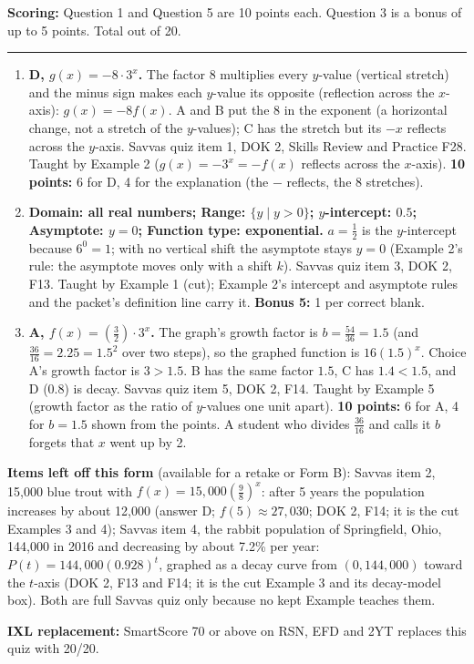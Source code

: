 \documentclass[11pt]{article}
\begin{document}
\vfill
\noindent\textbf{Scoring:} Question 1 and Question 5 are 10 points each. Question 3 is a bonus of up to 5 points. Total out of 20.

\newpage
{}

\vspace{4pt}\noindent\rule{\textwidth}{0.6pt}

\begin{enumerate}
\item[\textbf{1.}] \textbf{D, $g(x)=-8\cdot3^x$.} The factor 8 multiplies every $y$-value (vertical stretch) and the minus sign makes each $y$-value its opposite (reflection across the $x$-axis): $g(x)=-8f(x)$. A and B put the 8 in the exponent (a horizontal change, not a stretch of the $y$-values); C has the stretch but its $-x$ reflects across the $y$-axis. Savvas quiz item 1, DOK 2, Skills Review and Practice F28. Taught by Example 2 ($g(x)=-3^x=-f(x)$ reflects across the $x$-axis). \textbf{10 points:} 6 for D, 4 for the explanation (the $-$ reflects, the 8 stretches).
\item[\textbf{3.}] \textbf{Domain: all real numbers; Range: $\{y\mid y>0\}$; $y$-intercept: $0.5$; Asymptote: $y=0$; Function type: exponential.} $a=\frac12$ is the $y$-intercept because $6^0=1$; with no vertical shift the asymptote stays $y=0$ (Example 2's rule: the asymptote moves only with a shift $k$). Savvas quiz item 3, DOK 2, F13. Taught by Example 1 (cut); Example 2's intercept and asymptote rules and the packet's definition line carry it. \textbf{Bonus 5:} 1 per correct blank.
\item[\textbf{5.}] \textbf{A, $f(x)=\left(\frac32\right)\cdot3^x$.} The graph's growth factor is $b=\frac{54}{36}=1.5$ (and $\frac{36}{16}=2.25=1.5^2$ over two steps), so the graphed function is $16(1.5)^x$. Choice A's growth factor is $3>1.5$. B has the same factor $1.5$, C has $1.4<1.5$, and D ($0.8$) is decay. Savvas quiz item 5, DOK 2, F14. Taught by Example 5 (growth factor as the ratio of $y$-values one unit apart). \textbf{10 points:} 6 for A, 4 for $b=1.5$ shown from the points. A student who divides $\frac{36}{16}$ and calls it $b$ forgets that $x$ went up by 2.
\end{enumerate}

\textbf{Items left off this form} (available for a retake or Form B): Savvas item 2, 15,000 blue trout with $f(x)=15{,}000\left(\frac98\right)^x$: after 5 years the population increases by about 12,000 (answer D; $f(5)\approx27{,}030$; DOK 2, F14; it is the cut Examples 3 and 4); Savvas item 4, the rabbit population of Springfield, Ohio, 144,000 in 2016 and decreasing by about 7.2\% per year: $P(t)=144{,}000(0.928)^t$, graphed as a decay curve from $(0,144{,}000)$ toward the $t$-axis (DOK 2, F13 and F14; it is the cut Example 3 and its decay-model box). Both are full Savvas quiz only because no kept Example teaches them.

\textbf{IXL replacement:} SmartScore 70 or above on RSN, EFD and 2YT replaces this quiz with 20/20.
\end{document}
